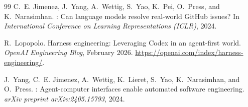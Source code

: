 \documentclass[11pt,twocolumn]{article}
\begin{document}
\begin{thebibliography}{99}
C.~E. Jimenez, J.~Yang, A.~Wettig, S.~Yao, K.~Pei, O.~Press, and
  K.~Narasimhan.
: Can language models resolve real-world {GitHub} issues?
\newblock In \emph{International Conference on Learning Representations
  (ICLR)}, 2024.

R.~Lopopolo.
\newblock Harness engineering: Leveraging {Codex} in an agent-first world.
\newblock \emph{OpenAI Engineering Blog}, February 2026.
\newblock \url{https://openai.com/index/harness-engineering/}.

J.~Yang, C.~E. Jimenez, A.~Wettig, K.~Lieret, S.~Yao, K.~Narasimhan,
  and O.~Press.
: Agent-computer interfaces enable automated software
  engineering.
\newblock \emph{arXiv preprint arXiv:2405.15793}, 2024.

\end{thebibliography}
\end{document}
